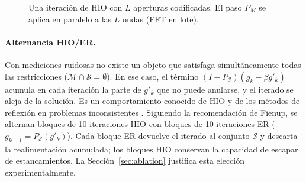 \documentclass[11pt,a4paper]{article}
\newcommand{\Prop}{\mathcal{P}[\Delta z]}
\newcommand{\PropInv}{\mathcal{P}[-\Delta z]}
\newcommand{\Obj}{\mathbf{O}}
\newcommand{\hio}{\textsc{HIO}}
\newcommand{\er}{\textsc{ER}}
\begin{document}
\begin{figure}[H]
\centering
{}
\caption{Una iteración de \hio{} con $L$ aperturas codificadas. El paso $P_M$ se aplica en paralelo a las $L$ ondas (FFT en lote).}
\label{fig:diagrama-hio}
\end{figure}

\paragraph{Alternancia \hio{}/\er{}.} Con mediciones ruidosas no existe un objeto que satisfaga simultáneamente todas las restricciones ($\mathcal{M}\cap\mathcal{S}=\emptyset$). En ese caso, el término $(I-P_\mathcal{S})(g_k-\beta g'_k)$ acumula en cada iteración la parte de $g'_k$ que no puede anularse, y el iterado se aleja de la solución. Es un comportamiento conocido de \hio{} y de los métodos de reflexión en problemas inconsistentes \cite{luke2005raar}. Siguiendo la recomendación de Fienup, se alternan bloques de 10 iteraciones \hio{} con bloques de 10 iteraciones \er{} ($g_{k+1}=P_\mathcal{S}(g'_k)$). Cada bloque \er{} devuelve el iterado al conjunto $\mathcal{S}$ y descarta la realimentación acumulada; los bloques \hio{} conservan la capacidad de escapar de estancamientos. La Sección~\ref{sec:ablation} justifica esta elección experimentalmente.
\end{document}
